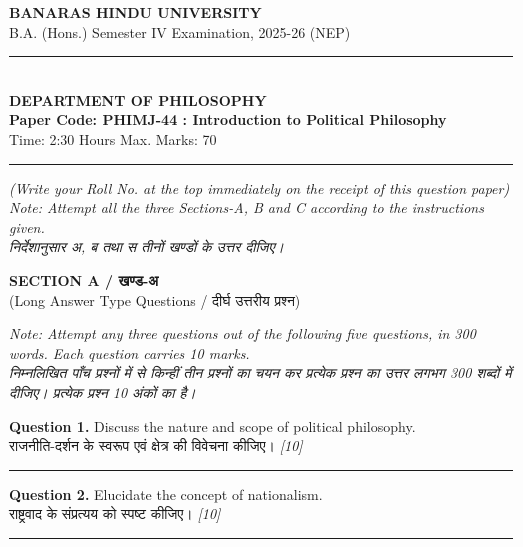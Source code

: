 \documentclass[11pt,a4paper]{article}
\newcommand{\pts}[1]{\hfill \textit{[#1]}}
\begin{document}
\begin{center}
  {\large\bfseries BANARAS HINDU UNIVERSITY}\\[2pt]
  {\normalsize B.A. (Hons.) Semester IV Examination, 2025-26 (NEP)}\\[6pt]
  \rule{0.8\linewidth}{0.5pt}\\[6pt]
  {\large\bfseries DEPARTMENT OF PHILOSOPHY}\\[4pt]
  {\large\bfseries Paper Code: PHIMJ-44 : Introduction to Political Philosophy}\\[4pt]
  {\normalsize Time: 2:30 Hours \hfill Max. Marks: 70}
\end{center}

\rule{\linewidth}{0.4pt}

\smallskip

\noindent \textit{(Write your Roll No. at the top immediately on the receipt of this question paper)}\\[2pt]
\noindent \textit{Note: Attempt all the three Sections-A, B and C according to the instructions given.}\\[1pt]
\noindent \textit{निर्देशानुसार अ, ब तथा स तीनों खण्डों के उत्तर दीजिए।}

\bigskip

\begin{center}
  {\large\bfseries SECTION A / खण्ड-अ}\\[2pt]
  {\normalsize (Long Answer Type Questions / दीर्घ उत्तरीय प्रश्न)}
\end{center}

\noindent \textit{Note: Attempt any three questions out of the following five questions, in 300 words. Each question carries 10 marks.}\\[2pt]
\noindent \textit{निम्नलिखित पाँच प्रश्नों में से किन्हीं तीन प्रश्नों का चयन कर प्रत्येक प्रश्न का उत्तर लगभग 300 शब्दों में दीजिए। प्रत्येक प्रश्न 10 अंकों का है।}

\bigskip

\noindent \textbf{Question 1.} Discuss the nature and scope of political philosophy.\\[1pt]
राजनीति-दर्शन के स्वरूप एवं क्षेत्र की विवेचना कीजिए। \pts{10}

\medskip\rule{\linewidth}{0.2pt}\medskip

\noindent \textbf{Question 2.} Elucidate the concept of nationalism.\\[1pt]
राष्ट्रवाद के संप्रत्यय को स्पष्ट कीजिए। \pts{10}

\medskip\rule{\linewidth}{0.2pt}\medskip
\end{document}
